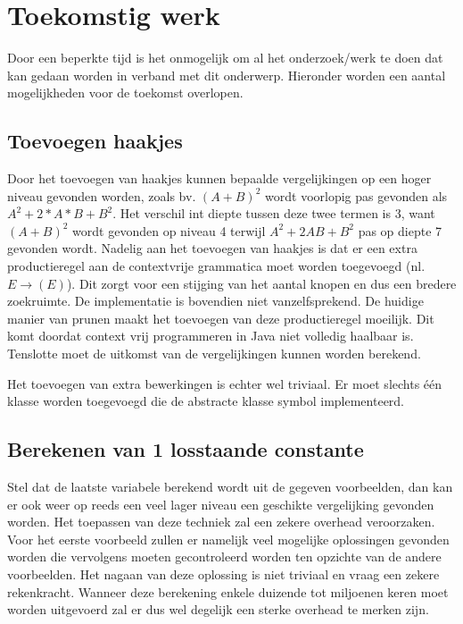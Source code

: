 \documentclass[Main.tex]{subfiles}
\begin{document}
\section{Toekomstig werk}
Door een beperkte tijd is het onmogelijk om al het onderzoek/werk te doen dat kan gedaan worden in verband met dit onderwerp. Hieronder worden een aantal mogelijkheden voor de toekomst overlopen.

\subsection{Toevoegen haakjes}
Door het toevoegen van haakjes kunnen bepaalde vergelijkingen op een hoger niveau gevonden worden, zoals bv. $(A+B)^2$ wordt voorlopig pas gevonden als $A^{2}+2 \ast A \ast B+B^{2}$. Het verschil int diepte tussen deze twee termen is 3, want $(A+B)^2$ wordt gevonden op niveau 4 terwijl $A^{2}+2AB+B^{2}$ pas op diepte 7 gevonden wordt. Nadelig aan het toevoegen van haakjes is dat er een extra productieregel aan de contextvrije grammatica moet worden toegevoegd (nl. $E \rightarrow (E)$). Dit zorgt voor een stijging van het aantal knopen en dus een bredere zoekruimte. De implementatie is bovendien niet vanzelfsprekend. De huidige manier van prunen maakt het toevoegen van deze productieregel moeilijk. Dit komt doordat context vrij programmeren in Java niet volledig haalbaar is. Tenslotte moet de uitkomst van de vergelijkingen kunnen worden berekend.\par 
Het toevoegen van extra bewerkingen is echter wel triviaal. Er moet slechts \'e\'en klasse worden toegevoegd die de abstracte klasse symbol implementeerd.

\subsection{Berekenen van 1 losstaande constante}
Stel dat de laatste variabele berekend wordt uit de gegeven voorbeelden, dan kan er ook weer op reeds een veel lager niveau een geschikte vergelijking gevonden worden. Het toepassen van deze techniek zal een zekere overhead veroorzaken. Voor het eerste voorbeeld zullen er namelijk veel mogelijke oplossingen gevonden worden die vervolgens moeten gecontroleerd worden ten opzichte van de andere voorbeelden. Het nagaan van deze oplossing is niet triviaal en vraag een zekere rekenkracht. Wanneer deze berekening enkele duizende tot miljoenen keren moet worden uitgevoerd zal er dus wel degelijk een sterke overhead te merken zijn.
\end{document}
